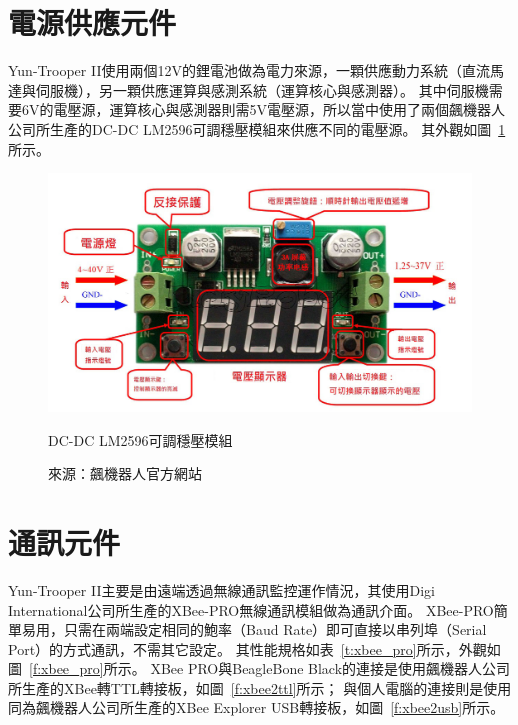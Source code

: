 \section{電源供應元件}
Yun-Trooper II使用兩個12V的鋰電池做為電力來源，一顆供應動力系統（直流馬達與伺服機），另一顆供應運算與感測系統（運算核心與感測器）。
其中伺服機需要6V的電壓源，運算核心與感測器則需5V電壓源，所以當中使用了兩個飆機器人公司所生產的DC-DC LM2596可調穩壓模組來供應不同的電壓源。
其外觀如圖~\ref{f:lm2596}所示。

\begin{figure}[h!]
	\centering
	\includegraphics[width=14cm]{figures/hardware/LM2596}
	\caption{DC-DC LM2596可調穩壓模組}
	\caption*{來源：飆機器人官方網站}
	\label{f:lm2596}
\end{figure}

\section{通訊元件}
Yun-Trooper II主要是由遠端透過無線通訊監控運作情況，其使用Digi International公司所生產的XBee-PRO無線通訊模組做為通訊介面。
XBee-PRO簡單易用，只需在兩端設定相同的鮑率（Baud Rate）即可直接以串列埠（Serial Port）的方式通訊，不需其它設定。
其性能規格如表~\ref{t:xbee_pro}所示，外觀如圖~\ref{f:xbee_pro}所示。
XBee PRO與BeagleBone Black的連接是使用飆機器人公司所生產的XBee轉TTL轉接板，如圖~\ref{f:xbee2ttl}所示；
與個人電腦的連接則是使用同為飆機器人公司所生產的XBee Explorer USB轉接板，如圖~\ref{f:xbee2usb}所示。

